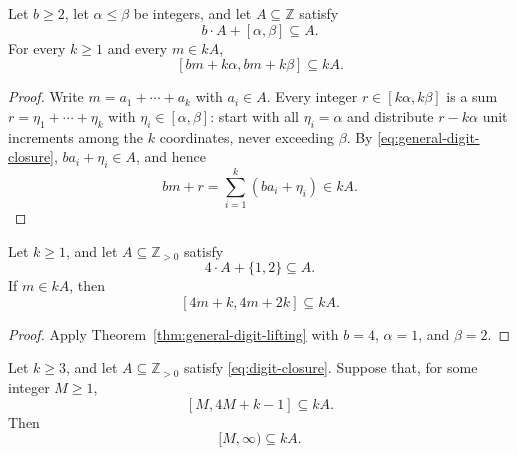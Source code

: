 \documentclass{ws-ijfcs}
\begin{document}
\begin{theorem}\label{thm:general-digit-lifting}
Let $b\geq2$, let $\alpha\leq\beta$ be integers, and let
$A\subseteq\mathbb Z$ satisfy
\begin{equation}\label{eq:general-digit-closure}
 b\cdot A+[\alpha,\beta]\subseteq A.
\end{equation}
For every $k\geq1$ and every $m\in kA$,
\begin{equation}\label{eq:general-digit-lifting}
 [bm+k\alpha,bm+k\beta]\subseteq kA.
\end{equation}
\end{theorem}

\begin{proof}
Write $m=a_1+\cdots+a_k$ with $a_i\in A$.  Every integer
$r\in[k\alpha,k\beta]$ is a sum
$r=\eta_1+\cdots+\eta_k$ with
$\eta_i\in[\alpha,\beta]$: start with all $\eta_i=\alpha$ and distribute
$r-k\alpha$ unit increments among the $k$ coordinates, never exceeding
$\beta$.  By \eqref{eq:general-digit-closure},
$ba_i+\eta_i\in A$, and hence
\[
 bm+r=\sum_{i=1}^{k}(ba_i+\eta_i)\in kA.
\]
\end{proof}

\begin{corollary}\label{lem:digit-lifting}
Let $k\geq1$, and let $A\subseteq\mathbb Z_{>0}$ satisfy
\begin{equation}\label{eq:digit-closure}
 4\cdot A+\{1,2\}\subseteq A.
\end{equation}
If $m\in kA$, then
\begin{equation}\label{eq:digit-lifting}
 [4m+k,4m+2k]\subseteq kA.
\end{equation}
\end{corollary}

\begin{proof}
Apply Theorem~\ref{thm:general-digit-lifting} with
$b=4$, $\alpha=1$, and $\beta=2$.
\end{proof}

\begin{corollary}
\label{cor:tail-propagation}
Let $k\geq3$, and let $A\subseteq\mathbb Z_{>0}$ satisfy
\eqref{eq:digit-closure}.  Suppose that, for some integer $M\geq1$,
\begin{equation}\label{eq:tail-seed}
 [M,4M+k-1]\subseteq kA.
\end{equation}
Then
\[
 [M,\infty)\subseteq kA.
\]
\end{corollary}
\end{document}
